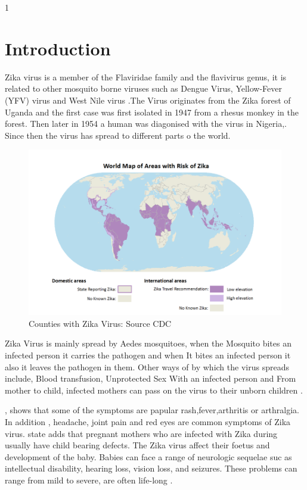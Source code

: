 1\chapter{Introduction}

Zika virus is a member of the Flaviridae family
and the flavivirus genus, it is related to other mosquito borne viruses such as Dengue Virus, Yellow-Fever (YFV) virus  and West Nile virus \citep{doi}.The Virus originates from the Zika forest of Uganda and the first case was first isolated in 1947 from a rhesus monkey in the forest. Then later in 1954 a human was diagonised with the virus in Nigeria,\citep{2015zika}. Since then the virus has spread to different parts o the world. 
\begin{figure}[h!]
\centering
\includegraphics[scale=0.4]{images/map_zika.png}
\caption{Counties with Zika Virus: Source CDC}\label{fig 1}
\end{figure}


Zika Virus is mainly spread by Aedes mosquitoes, when the Mosquito bites an infected person it carries the pathogen and when It bites an infected person it also it leaves the pathogen in them. Other ways of by which the virus spreads include, Blood transfusion, Unprotected Sex With an infected person and From mother to child, infected mothers can pass on the virus to their unborn children \citep{musso2014}.

\cite{musso2015}, shows that some of the symptoms are papular rash,fever,arthritis or arthralgia. In addition , headache, joint pain and red eyes are common symptoms of Zika virus. \cite{simoes2016zika} state adds that pregnant mothers who are infected with Zika during usually have child bearing defects. The Zika virus affect their foetus and development of the baby. Babies can face a range of neurologic sequelae suc as intellectual disability, hearing loss, vision loss, and seizures. These problems can range from mild to severe, are often life-long \citep{rasmussen2016zika}.

